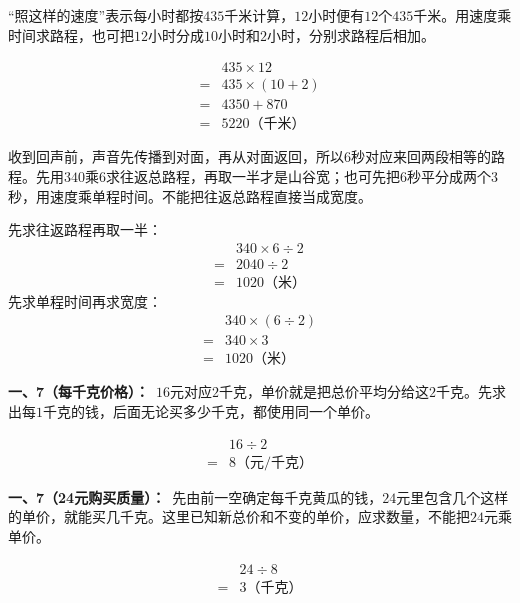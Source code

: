 \documentclass[multi=snippet,border=0pt]{standalone}
\newenvironment{snippet}[3]{\begin{minipage}{#1bp}\color{answerred}\fontsize{#2}{#3}\selectfont\raggedright}{\end{minipage}}
\begin{document}
\begin{snippet}{505}{11.5}{14}“照这样的速度”表示每小时都按\(435\)千米计算，\(12\)小时便有\(12\)个\(435\)千米。用速度乘时间求路程，也可把\(12\)小时分成\(10\)小时和\(2\)小时，分别求路程后相加。\par \[\begin{aligned}&435\times12\\={}&435\times(10+2)\\={}&4350+870\\={}&5220\text{（千米）}\end{aligned}\]\end{snippet}
\begin{snippet}{505}{11.5}{14}收到回声前，声音先传播到对面，再从对面返回，所以\(6\)秒对应来回两段相等的路程。先用\(340\)乘\(6\)求往返总路程，再取一半才是山谷宽；也可先把\(6\)秒平分成两个\(3\)秒，用速度乘单程时间。不能把往返总路程直接当成宽度。\par 先求往返路程再取一半：\[\begin{aligned}&340\times6\div2\\={}&2040\div2\\={}&1020\text{（米）}\end{aligned}\]先求单程时间再求宽度：\[\begin{aligned}&340\times(6\div2)\\={}&340\times3\\={}&1020\text{（米）}\end{aligned}\]\end{snippet}
\begin{snippet}{505}{11.5}{14}\textbf{一、7（每千克价格）：}\ \(16\)元对应\(2\)千克，单价就是把总价平均分给这\(2\)千克。先求出每\(1\)千克的钱，后面无论买多少千克，都使用同一个单价。\par \[\begin{aligned}&16\div2\\={}&8\text{（元/千克）}\end{aligned}\]\end{snippet}
\begin{snippet}{505}{11.5}{14}\textbf{一、7（24元购买质量）：}\ 先由前一空确定每千克黄瓜的钱，\(24\)元里包含几个这样的单价，就能买几千克。这里已知新总价和不变的单价，应求数量，不能把\(24\)元乘单价。\par \[\begin{aligned}&24\div8\\={}&3\text{（千克）}\end{aligned}\]\end{snippet}
\end{document}
